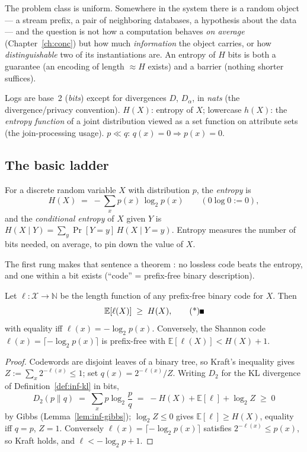 The problem class is uniform. Somewhere in the system there is a random object --- a
stream prefix, a pair of neighboring databases, a hypothesis about the data --- and the
question is not how a computation behaves \emph{on average} (Chapter~\ref{ch:conc}) but
how much \emph{information} the object carries, or how \emph{distinguishable} two of
its instantiations are. An entropy of $H$ bits is both a guarantee (an encoding of
length $\approx H$ exists) and a barrier (nothing shorter suffices).

\begin{remarkbox}[Notation]
Logs are base~2 (\emph{bits}) except for divergences $D$, $D_\alpha$, in \emph{nats}
(the divergence/privacy convention). $H(X)$: entropy of $X$; lowercase $h(X)$: the
\emph{entropy function} of a joint distribution viewed as a set function on attribute
sets (the join-processing usage). $p \ll q$: $q(x) = 0 \Rightarrow p(x) = 0$.
\end{remarkbox}

\subsection{The basic ladder}
\label{sec:inf-ladder}

\begin{definition}\label{def:inf-entropy}
For a discrete random variable $X$ with distribution $p$, the \emph{entropy} is
\[
H(X) \;=\; -\sum_{x} p(x)\,\log_2 p(x) \qquad (0\log 0 := 0),
\]
and the \emph{conditional entropy} of $X$ given $Y$ is
$H(X \mid Y) = \sum_y \Pr[Y = y]\,H(X \mid Y = y)$. Entropy measures the number of bits
needed, on average, to pin down the value of $X$.
\end{definition}

The first rung makes that sentence a theorem \citep{information-theory-bg1,
information-theory-bg2}: no lossless code beats the entropy, and one within a bit
exists (``code'' = prefix-free binary description).

\begin{theorem}\label{thm:inf-source}
Let $\ell\colon \mathcal{X} \to \mathbb{N}$ be the length function of any prefix-free
binary code for $X$. Then
\[
\mathbb{E}[\ell(X)] \;\ge\; H(X), \eopm
\]
with equality iff $\ell(x) = -\log_2 p(x)$. Conversely, the Shannon code $\ell(x) =
\lceil -\log_2 p(x)\rceil$ is prefix-free with $\mathbb{E}[\ell(X)] < H(X) + 1$.
\end{theorem}

\begin{proof}
Codewords are disjoint leaves of a binary tree, so Kraft's inequality gives
$Z := \sum_x 2^{-\ell(x)} \le 1$; set $q(x) = 2^{-\ell(x)}/Z$. Writing $D_2$ for the
KL divergence of Definition~\ref{def:inf-kl} in bits,
\[
D_2(p\|q) \;=\; \sum_x p \log_2\frac{p}{q}
\;=\; -H(X) + \mathbb{E}[\ell] + \log_2 Z \;\ge\; 0
\]
by Gibbs (Lemma~\ref{lem:inf-gibbs}); $\log_2 Z \le 0$ gives $\mathbb{E}[\ell] \ge
H(X)$, equality iff $q = p$, $Z = 1$. Conversely $\ell(x) = \lceil -\log_2 p(x)\rceil$
satisfies $2^{-\ell(x)} \le p(x)$, so Kraft holds, and $\ell < -\log_2 p + 1$.
\end{proof}

